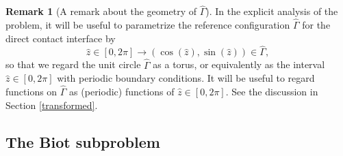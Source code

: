 \documentclass[11pt]{article}
\theoremstyle{definition}
\newtheorem{remark}{Remark}[section]
\begin{document}
\begin{remark}[A remark about the geometry of $\hat{\Gamma}$]
In the explicit analysis of the problem, it will be useful to parametrize the reference configuration $\hat{\Gamma}$ for the direct contact interface by 
\begin{equation*}
\hat{z} \in [0, 2\pi] \to (\cos(\hat{z}), \sin(\hat{z})) \in \hat{\Gamma},
\end{equation*}
so that we regard the unit circle $\hat{\Gamma}$ as a torus, or equivalently as the interval $\hat{z} \in [0, 2\pi]$ with periodic boundary conditions. It will be useful to regard functions on $\hat{\Gamma}$ as (periodic) functions of $\hat{z} \in [0, 2\pi]$. See the discussion in Section \ref{transformed}.
\end{remark}

\subsection{The Biot subproblem}
\end{document}
